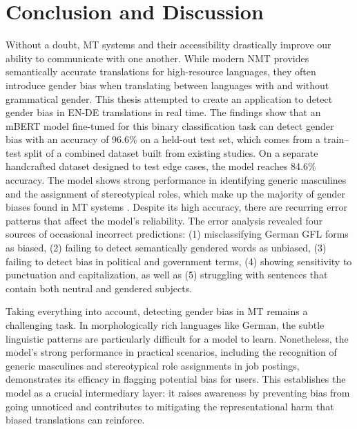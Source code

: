 \chapter{Conclusion and Discussion}
   Without a doubt, MT systems and their accessibility drastically improve our ability to communicate with one another. While modern NMT provides semantically accurate translations for high-resource languages, they often introduce gender bias when translating between languages with and without grammatical gender. This thesis attempted to create an application to detect gender bias in EN-DE translations in real time. The findings show that an mBERT model fine-tuned for this binary classification task can detect gender bias with an accuracy of 96.6\% on a held-out test set, which comes from a train–test split of a combined dataset built from existing studies. On a separate handcrafted dataset designed to test edge cases, the model reaches 84.6\% accuracy. The model shows strong performance in identifying generic masculines and the assignment of stereotypical roles, which make up the majority of gender biases found in MT systems \parencite{lardelliBuildingBridgesDataset2024,stanovskyEvaluatingGenderBias2019,pratesAssessingGenderBias2019}. Despite its high accuracy, there are recurring error patterns that affect the model’s reliability. The error analysis revealed four sources of occasional incorrect predictions: (1) misclassifying German GFL forms as biased, (2) failing to detect semantically gendered words as unbiased, (3) failing to detect bias in political and government terms, (4) showing sensitivity to punctuation and capitalization, as well as (5) struggling with sentences that contain both neutral and gendered subjects.

   Taking everything into account, detecting gender bias in MT remains a challenging task. In morphologically rich languages like German, the subtle linguistic patterns are particularly difficult for a model to learn. Nonetheless, the model's strong performance in practical scenarios, including the recognition of generic masculines and stereotypical role assignments in job postings, demonstrates its efficacy in flagging potential bias for users. This establishes the model as a crucial intermediary layer: it raises awareness by preventing bias from going unnoticed and contributes to mitigating the representational harm that biased translations can reinforce.

